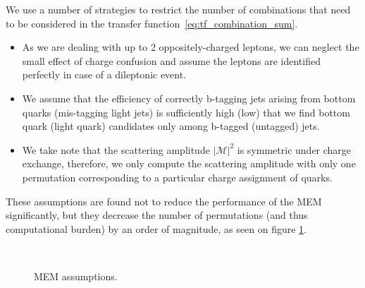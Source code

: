 We use a number of strategies to restrict the number of combinations that need to be considered in the transfer function~\cref{eq:tf_combination_sum}. 

\begin{itemize}
\item As we are dealing with up to 2 oppositely-charged leptons, we can neglect the small effect of charge confusion and assume the leptons are identified perfectly in case of a dileptonic event.
\item We assume that the efficiency of correctly b-tagging jets arising from bottom quarks (mis-tagging light jets) is sufficiently high (low) that we find bottom quark (light quark) candidates only among b-tagged (untagged) jets.
\item We take note that the scattering amplitude $|\mathcal{M}|^2$ is symmetric under charge exchange, therefore, we only compute the scattering amplitude with only one permutation corresponding to a particular charge assignment of quarks.  
\end{itemize}
These assumptions are found not to reduce the performance of the MEM significantly, but they decrease the number of permutations (and thus computational burden) by an order of magnitude, as seen on figure \cref{fig:mem_assumptions}.

\begin{figure}
\begin{centering}
\\
\caption{MEM assumptions.}
\label{fig:mem_assumptions}
\end{centering}
\end{figure}

